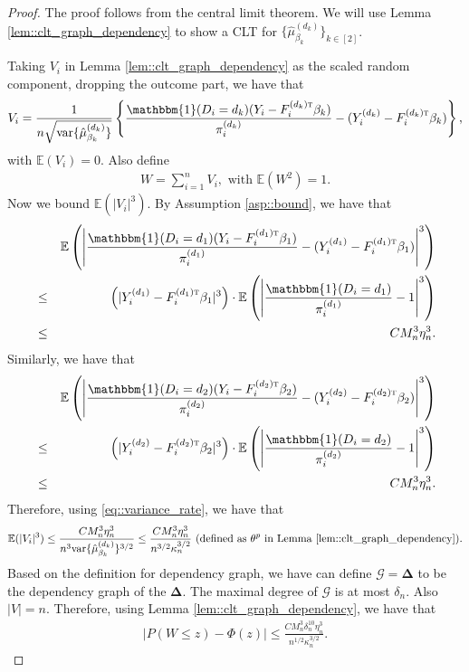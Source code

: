 \documentclass{article}
\theoremstyle{plain}
\theoremstyle{definition}
\theoremstyle{remark}
\newcommand{\E}{\mathbb{E}}
\def\T{{\textsc{t}}}
\newcommand{\var}{\textup{var}}
\newcommand{\bDelta}{\boldsymbol{\Delta}}
\newcommand{\indicator}{\mathbbm{1}}
\newcommand{\cG}{\mathcal{G}}
\newcommand{\sumi}{\sum_{i=1}^n}
\begin{document}
\begin{proof}
    The proof follows from the central limit theorem. We will use Lemma \ref{lem::clt_graph_dependency} to show a CLT for $\{\hat\mu^{(d_k)}_{\beta_k}\}_{k\in[2]}$. 
    
    Taking $V_i$ in Lemma \ref{lem::clt_graph_dependency} as the scaled random component, dropping the outcome part, we have that
    \begin{eqnarray*}
        V_i = \frac{1}{n\sqrt{\var\{\hat\mu^{(d_k)}_{\beta_k}\}}} \left\{\frac{\indicator(D_i=d_k)(Y_i - F_i^{(d_k)\T} \beta_k)}{\pi_i^{(d_k) } } - (Y_i^{(d_k)} - F_i^{(d_k)\T} \beta_k)\right\}, 
    \end{eqnarray*}
    with $\E(V_i) = 0$. Also define 
    \begin{eqnarray*}
        W = \sumi V_i, \text{ with } \E(W^2) = 1.
    \end{eqnarray*}
    Now we bound $\E(|V_i|^3)$. By Assumption \ref{asp::bound}, we have that
    \begin{eqnarray*}
        &&\E\left(\left|\frac{\indicator(D_i=d_1)(Y_i - F_i^{(d_1)\T} \beta_1)}{\pi_i^{(d_1) } } - (Y_i^{(d_1)} - F_i^{(d_1)\T} \beta_1)\right|^3\right) \\
        &\le& \left(|Y_i^{(d_1)} - F_i^{(d_1)\T} \beta_1|^3\right) \cdot \E\left(\left|\frac{\indicator(D_i=d_1)}{\pi_i^{(d_1)}} - 1\right|^3\right) \\
        &\le& C M_n^3 \eta_n^3.
    \end{eqnarray*}
    Similarly, we have that
    \begin{eqnarray*}
        &&\E\left(\left|\frac{\indicator(D_i=d_2)(Y_i - F_i^{(d_2)\T} \beta_2)}{\pi_i^{(d_2) } } - (Y_i^{(d_2)} - F_i^{(d_2)\T} \beta_2)\right|^3\right) \\
        &\le& \left(|Y_i^{(d_2)} - F_i^{(d_2)\T} \beta_2|^3\right) \cdot \E\left(\left|\frac{\indicator(D_i=d_2)}{\pi_i^{(d_2)}} - 1\right|^3\right) \\
        &\le& C M_n^3 \eta_n^3.
    \end{eqnarray*}
    Therefore, using \eqref{eq::variance_rate}, we have that
    \begin{eqnarray*}
        \E(|V_i|^3) \leq \frac{C M_n^3 \eta_n^3}{n^3 \var\{\hat\mu^{(d_k)}_{\beta_k}\}^{3/2}} \leq \frac{C M_n^3 \eta_n^3}{n^{3/2} \kappa_n^{3/2} } \text{ (defined as $\theta^p$ in Lemma \ref{lem::clt_graph_dependency})}.
    \end{eqnarray*}
    Based on the definition for dependency graph, we have can define $\cG = \bDelta$ to be the dependency graph of the $\bDelta$. The maximal degree of $\cG$ is at most $\delta_n$. Also $|V| = n$. Therefore, using Lemma \ref{lem::clt_graph_dependency}, we have that
    \begin{eqnarray*}
        |P(W \leq z) - \Phi(z)| \leq \frac{C M_n^3 \delta_n^{10} \eta_n^3}{n^{1/2} \kappa_n^{3/2} }. 
    \end{eqnarray*}
     
    
\end{proof}
\end{document}
